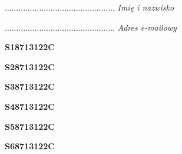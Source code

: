 \begin{turn}{90}\begin{minipage}{\linewidth} \vspace{20mm} ................................................  \textit{Imię i nazwisko}\end{minipage}\end{turn}

\begin{turn}{90}\begin{minipage}{\linewidth} \vspace{20mm} ................................................  \textit{Adres e-mailowy}\end{minipage}\end{turn}

\begin{turn}{90}\huge \begin{minipage}{\linewidth} \vspace{10mm}\textbf{S18713122C}\end{minipage}\end{turn}

\begin{turn}{90}\huge \begin{minipage}{\linewidth} \vspace{10mm}\textbf{S28713122C}\end{minipage}\end{turn}

\begin{turn}{90}\huge \begin{minipage}{\linewidth} \vspace{10mm}\textbf{S38713122C}\end{minipage}\end{turn}

\begin{turn}{90}\huge \begin{minipage}{\linewidth} \vspace{10mm}\textbf{S48713122C}\end{minipage}\end{turn}

\begin{turn}{90}\huge \begin{minipage}{\linewidth} \vspace{10mm}\textbf{S58713122C}\end{minipage}\end{turn}

\begin{turn}{90}\huge \begin{minipage}{\linewidth} \vspace{10mm}\textbf{S68713122C}\end{minipage}\end{turn}

